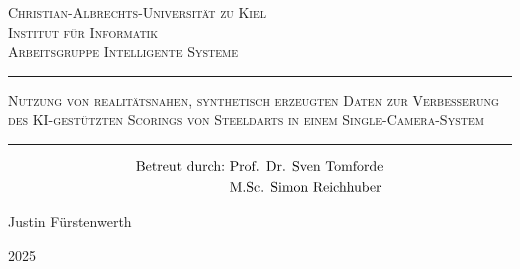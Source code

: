 
\begin{titlepage}
    \centering

    {\LARGE \scshape Christian-Albrechts-Universität zu Kiel}\\
    \vspace{0.25cm}
    {\large \scshape Institut für Informatik}\\
    \vspace{0.1cm}
    {\large \scshape Arbeitsgruppe Intelligente Systeme}



    \vfill

    {\Huge \scshape {}}

    \vspace{0.75cm}

    \hrule
    \vspace{0.5cm}
    {\LARGE \scshape Nutzung von realitätsnahen, synthetisch erzeugten}
    \vspace{0.15cm}
    {\LARGE \scshape Daten zur Verbesserung des KI-gestützten Scorings}
    \vspace{0.15cm}
    {\LARGE \scshape von Steeldarts in einem Single-Camera-System}
    \vspace{0.5cm}
    \hrule
    \begin{align*}
        \text{Betreut durch:} & \text{\,\,Prof. Dr. Sven Tomforde} \\
                              & \text{\,\,M.Sc. Simon Reichhuber}
    \end{align*}

    \vfill

    {\Large Justin Fürstenwerth}

    \vspace{0.2cm}

    {\large 2025}

\end{titlepage}
